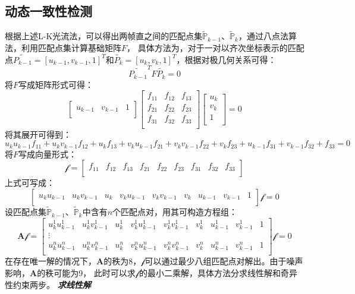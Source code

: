 \subsection{动态一致性检测}
根据上述L-K光流法，可以得出两帧直之间的匹配点集$\mathbb{\widetilde{P}}_{k-1}$、$\mathbb{\widetilde{P}}_{k}$，通过八点法算法，利用匹配点集计算基础矩阵$F$，
具体方法为，对于一对以齐次坐标表示的匹配点$\widetilde{P_{k-1}}=\left[u_{k-1},v_{k-1},1\right]^{T}$和$\widetilde{P_{k}}=\left[u_{k},v_{k},1\right]^{T}$，根据对极几何关系可得：
$$\widetilde{P_{k-1}}^{T}F\widetilde{P_{k}}=0$$
将$F$写成矩阵形式可得：
$$
\left[
\begin{array}{ccc}
    u_{k-1} & v_{k-1} & 1\\
\end{array}
\right]
\left[
\begin{array}{ccc}
    f_{11} & f_{12} & f_{13}\\
    f_{21} & f_{22} & f_{23}\\
    f_{31} & f_{32} & f_{33}\\
\end{array}
\right]
\left[
\begin{array}{l}
    u_{k}\\
    v_{k}\\
    1\\
\end{array}
\right]
=0
$$
将其展开可得到：
$$u_{k}u_{k-1}f_{11}+u_{k}v_{k-1}f_{12}+u_{k}f_{13}+v_{k}u_{k-1}f_{21}+v_{k}v_{k-1}f_{22}+v_{k}f_{23}+u_{k-1}f_{31}+v_{k-1}f_{32}+f_{33}=0$$
将$F$写成向量形式：
$$\mathcal{f}=
\left[
\begin{array}{ccccccccc}
    f_{11} & f_{12} & f_{13} & f_{21} & f_{22} & f_{23} & f_{31} & f_{32} & f_{33}\\
\end{array}
\right]
$$
上式可写成：
$$
\left[
\begin{array}{ccccccccc}
    u_{k}u_{k-1} & u_{k}v_{k-1} & u_{k} & v_{k}u_{k-1} & v_{k}v_{k-1} & v_{k} & u_{k-1} & v_{k-1} & 1\\
\end{array}
\right]
\mathcal{f}
=0
$$
设匹配点集$\mathbb{\widetilde{P}}_{k-1}$、$\mathbb{\widetilde{P}}_{k}$中含有$n$个匹配点对，用其可构造方程组：
$$
\textbf{A}\mathcal{f}=
\left[
\begin{array}{ccccccccc}
    u_{k}^{1}u_{k-1}^{1} & u_{k}^{1}v_{k-1}^{1} & u_{k}^{1} & v_{k}^{1}u_{k-1}^{1} & v_{k}^{1}v_{k-1}^{1} & v_{k}^{1} & u_{k-1}^{1} & v_{k-1}^{1} & 1\\
    \vdots\\
    u_{k}^{n}u_{k-1}^{n} & u_{k}^{n}v_{k-1}^{n} & u_{k}^{n} & v_{k}^{n}u_{k-1}^{n} & v_{k}^{n}v_{k-1}^{n} & v_{k}^{n} & u_{k-1}^{n} & v_{k-1}^{n} & 1\\
\end{array}
\right]
\mathcal{f}
=0
$$
在存在唯一解的情况下，$\textbf{A}$的秩为8，$\mathcal{f}$可以通过最少八组匹配点对解出。由于噪声影响，$\textbf{A}$的秩可能为9，
此时可以求$\mathcal{f}$的最小二乘解，具体方法分求线性解和奇异性约束两步。
\textbf{\emph{求线性解}}

